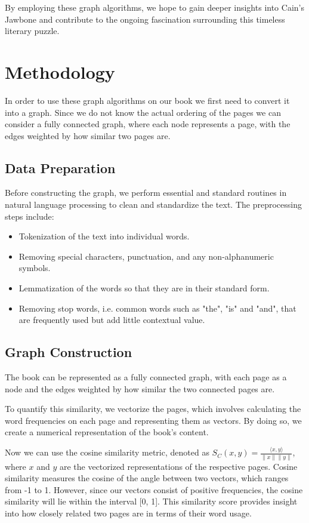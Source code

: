 \documentclass[a4paper]{article}
\begin{document}
By employing these graph algorithms, we hope to gain deeper insights into Cain's Jawbone and contribute to the ongoing fascination surrounding this timeless literary puzzle.


\section{Methodology}

In order to use these graph algorithms on our book we first need to convert it into a graph. Since we do not know the actual ordering of the pages we can consider a fully connected graph, where each node represents a page, with the edges weighted by how similar two pages are.

\subsection{Data Preparation}

Before constructing the graph, we perform essential and standard routines in natural language processing to clean and standardize the text. The preprocessing steps include:

\begin{itemize}
    \item Tokenization of the text into individual words.
    \item Removing special characters, punctuation, and any non-alphanumeric symbols.
    \item Lemmatization of the words so that they are in their standard form.
    \item Removing stop words, i.e. common words such as "the", "is" and "and", that are frequently used but add little contextual value.
\end{itemize}

\subsection{Graph Construction}

The book can be represented as a fully connected graph, with each page as a node and the edges weighted by how similar the two connected pages are.

To quantify this similarity, we vectorize the pages, which involves calculating the word frequencies on each page and representing them as vectors. By doing so, we create a numerical representation of the book's content.

Now we can use the cosine similarity metric, denoted as $S_C(x, y) = \frac{\langle x, y \rangle}{\|x\| \|y\|}$, where $x$ and $y$ are the vectorized representations of the respective pages. Cosine similarity measures the cosine of the angle between two vectors, which ranges from -1 to 1. However, since our vectors consist of positive frequencies, the cosine similarity will lie within the interval [0, 1]. This similarity score provides insight into how closely related two pages are in terms of their word usage.
\end{document}
